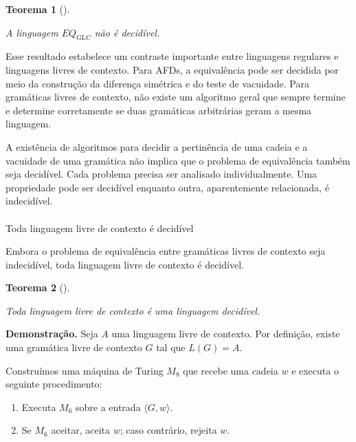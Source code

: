 \documentclass[
  brazilian,
  letterpaper,
]{book}
\makeatletter
\let\oldparagraph\paragraph
\renewcommand{\paragraph}{
    \@ifstar
      \xxxParagraphStar
      \xxxParagraphNoStar
  }
\newcommand{\xxxParagraphStar}[1]{\oldparagraph*{#1}\mbox{}}
\newcommand{\xxxParagraphNoStar}[1]{\oldparagraph{#1}\mbox{}}
\providecommand{\tightlist}{%
  \setlength{\itemsep}{0pt}\setlength{\parskip}{0pt}}
\theoremstyle{plain}
\newtheorem{theorem}{Teorema}[chapter]
\theoremstyle{definition}
\theoremstyle{remark}
\makeatother
\begin{document}
\begin{theorem}[]\protect\hypertarget{thm-glc-eq}{}\label{thm-glc-eq}

A linguagem \(EQ_{\mathrm{GLC}}\) não é decidível.

\end{theorem}

Esse resultado estabelece um contraste importante entre linguagens
regulares e linguagens livres de contexto. Para AFDs, a equivalência
pode ser decidida por meio da construção da diferença simétrica e do
teste de vacuidade. Para gramáticas livres de contexto, não existe um
algoritmo geral que sempre termine e determine corretamente se duas
gramáticas arbitrárias geram a mesma linguagem.

A existência de algoritmos para decidir a pertinência de uma cadeia e a
vacuidade de uma gramática não implica que o problema de equivalência
também seja decidível. Cada problema precisa ser analisado
individualmente. Uma propriedade pode ser decidível enquanto outra,
aparentemente relacionada, é indecidível.

\paragraph{Toda linguagem livre de contexto é
decidível}\label{toda-linguagem-livre-de-contexto-uxe9-deciduxedvel}

Embora o problema de equivalência entre gramáticas livres de contexto
seja indecidível, toda linguagem livre de contexto é decidível.

\begin{theorem}[]\protect\hypertarget{thm-llc}{}\label{thm-llc}

Toda linguagem livre de contexto é uma linguagem decidível.

\end{theorem}

\textbf{Demonstração.} Seja \(A\) uma linguagem livre de contexto. Por
definição, existe uma gramática livre de contexto \(G\) tal que
\(L(G)=A\).

Construímos uma máquina de Turing \(M_8\) que recebe uma cadeia \(w\) e
executa o seguinte procedimento:

\begin{enumerate}
\def\labelenumi{\arabic{enumi}.}
\tightlist
\item
  Executa \(M_6\) sobre a entrada \(\langle G,w\rangle\).
\item
  Se \(M_6\) aceitar, aceita \(w\); caso contrário, rejeita \(w\).
\end{enumerate}
\end{document}
